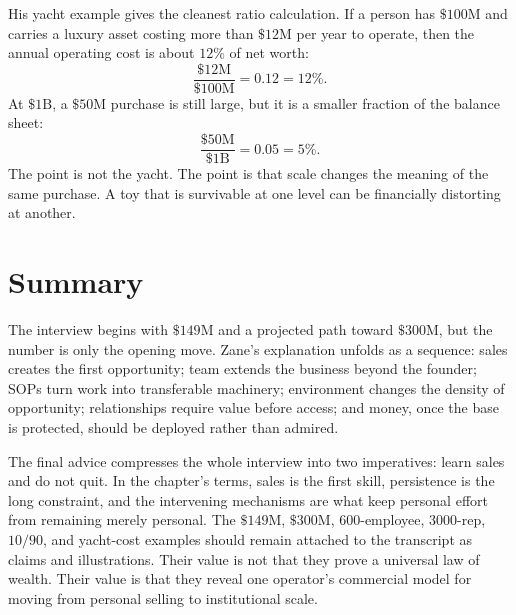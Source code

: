 His yacht example gives the cleanest ratio calculation. If a person has \(\$100\mathrm{M}\) and carries a luxury asset costing more than \(\$12\mathrm{M}\) per year to operate, then the annual operating cost is about \(12\%\) of net worth:
\begin{equation}
\frac{\$12\mathrm{M}}{\$100\mathrm{M}}
=
0.12
=
12\%.
\end{equation}
At \(\$1\mathrm{B}\), a \(\$50\mathrm{M}\) purchase is still large, but it is a smaller fraction of the balance sheet:
\begin{equation}
\frac{\$50\mathrm{M}}{\$1\mathrm{B}}
=
0.05
=
5\%.
\end{equation}
The point is not the yacht. The point is that scale changes the meaning of the same purchase. A toy that is survivable at one level can be financially distorting at another.

\section{Summary}

The interview begins with \(\$149\mathrm{M}\) and a projected path toward \(\$300\mathrm{M}\), but the number is only the opening move. Zane's explanation unfolds as a sequence: sales creates the first opportunity; team extends the business beyond the founder; SOPs turn work into transferable machinery; environment changes the density of opportunity; relationships require value before access; and money, once the base is protected, should be deployed rather than admired.

The final advice compresses the whole interview into two imperatives: learn sales and do not quit. In the chapter's terms, sales is the first skill, persistence is the long constraint, and the intervening mechanisms are what keep personal effort from remaining merely personal. The \(\$149\mathrm{M}\), \(\$300\mathrm{M}\), \(600\)-employee, \(3000\)-rep, \(10/90\), and yacht-cost examples should remain attached to the transcript as claims and illustrations. Their value is not that they prove a universal law of wealth. Their value is that they reveal one operator's commercial model for moving from personal selling to institutional scale.